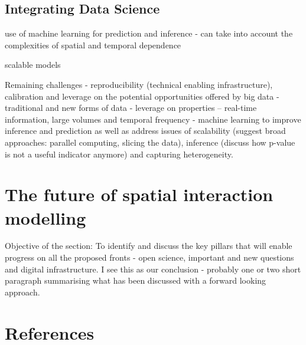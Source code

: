 \documentclass[11pt,letterpaper]{article}
\begin{document}
\hypertarget{integrating-data-science}{%
\subsection{\texorpdfstring{Integrating Data Science }{Integrating Data Science }}\label{integrating-data-science}}

use of machine learning for prediction and inference - can take into account the complexities of spatial and temporal dependence

scalable models

Remaining challenges - reproducibility (technical enabling infrastructure), calibration and leverage on the potential opportunities offered by big data - traditional and new forms of data - leverage on properties -- real-time information, large volumes and temporal frequency - machine learning to improve inference and prediction as well as address issues of scalability (suggest broad approaches: parallel computing, slicing the data), inference (discuss how p-value is not a useful indicator anymore) and capturing heterogeneity.

\hypertarget{the-future-of-spatial-interaction-modelling}{%
\section{The future of spatial interaction modelling}\label{the-future-of-spatial-interaction-modelling}}

Objective of the section: To identify and discuss the key pillars that will enable progress on all the proposed fronts - open science, important and new questions and digital infrastructure.
I see this as our conclusion - probably one or two short paragraph summarising what has been discussed with a forward looking approach.

\begin{quote}
\end{quote}

\hypertarget{references}{%
\section*{References}\label{references}}
\end{document}
